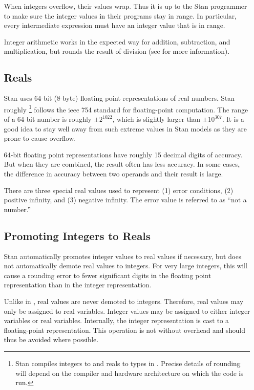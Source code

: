 When integers overflow, their values wrap.  Thus it is up to the Stan
programmer to make sure the integer values in their programs stay in
range.  In particular, every intermediate expression must have an
integer value that is in range.

Integer arithmetic works in the expected way for addition,
subtraction, and multiplication, but rounds the result of division
(see  for more information).

\subsection{Reals}

Stan uses 64-bit (8-byte) floating point representations of real
numbers.  Stan roughly%
%
\footnote{Stan compiles integers to  and reals to
   types in \Cpp.  Precise details of rounding will depend
  on the compiler and hardware architecture on which the code is run.}
%
follows the {\sc ieee} 754 standard for floating-point computation.
The range of a 64-bit number is roughly $\pm 2^{1022}$, which is
slightly larger than $\pm 10^{307}$.  It is a good idea to stay well
away from such extreme values in Stan models as they are prone to
cause overflow.

64-bit floating point representations have roughly 15 decimal digits
of accuracy.  But when they are combined, the result often has less
accuracy.  In some cases, the difference in accuracy between two
operands and their result is large.

There are three special real values used to represent (1) error
conditions, (2) positive infinity, and (3) negative infinity.  The
error value is referred to as ``not a number.''

\subsection{Promoting Integers to Reals}

Stan automatically promotes integer values to real values if
necessary, but does not automatically demote real values to integers.
For very large integers, this will cause a rounding error to fewer
significant digits in the floating point representation than in the
integer representation.

Unlike in \Cpp, real values are never demoted to integers.  Therefore,
real values may only be assigned to real variables.  Integer values
may be assigned to either integer variables or real variables.
Internally, the integer representation is cast to a floating-point
representation.  This operation is not without overhead and should
thus be avoided where possible.


